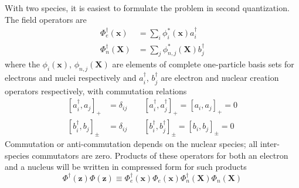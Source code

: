\documentclass[aps,preprint]{revtex4}%
\begin{document}
With two species, it is easiest to formulate the problem in second
quantization. The field operators are
\begin{align}
\Phi^{\dagger}_{e}(\mathbf{x})  &  = \sum_{i} \phi^{*}_{i}(\mathbf{x}%
)a_{i}^{\dagger}\nonumber\\
\Phi^{\dagger}_{n}(\mathbf{X})  &  = \sum_{j} \phi_{n,j}^{*}(\mathbf{X}%
)b_{j}^{\dagger} \label{fieldop}%
\end{align}
where the $\phi_{i}(\mathbf{x})$, $\phi_{n,j}(\mathbf{X})$ are elements of
complete one-particle basis sets for electrons and nuclei respectively and
$a_{i}^{\dagger}$, $b_{j}^{\dagger}$ are electron and nuclear creation
operators respectively, with commutation relations
\begin{align}
\left[  a_{i}^{\dagger}, a_{j} \right]  _{+}  &  = \delta_{ij} \qquad\left[
a_{i}^{\dagger}, a^{\dagger}_{j} \right]  _{+} = \left[  a_{i}, a_{j} \right]
_{+} = 0\nonumber\\
\left[  b_{i}^{\dagger}, b_{j} \right]  _{\pm}  &  = \delta_{ij} \qquad\left[
b_{i}^{\dagger}, b^{\dagger}_{j} \right]  _{\pm} = \left[  b_{i},b_{j}
\right]  _{\pm} = 0
\end{align}
Commutation or anti-commutation depends on the nuclear species; all
inter-species commutators are zero. Products of these operators for both an
electron and a nucleus will be written in compressed form for such products
\begin{equation}
\Phi^{\dagger}(\mathbf{z})\Phi(\mathbf{z}) \equiv\Phi^{\dagger}_{e}%
(\mathbf{x}) \Phi_{e}(\mathbf{x})\Phi^{\dagger}_{n}(\mathbf{X}) \Phi
_{n}(\mathbf{X}) \label{fieldopprod}%
\end{equation}
\end{document}
